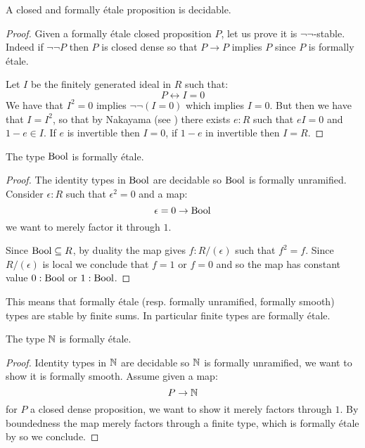 \begin{lemma}\label{closed-and-etale-decidable}
A closed and formally étale proposition is decidable.
\end{lemma} 

\begin{proof}
Given a formally étale closed proposition $P$, let us prove it is $\neg\neg$-stable. Indeed if $\neg\neg P$ then $P$ is closed dense so that $P\to P$ implies $P$ since $P$ is formally étale. 

Let $I$ be the finitely generated ideal in $R$ such that:
\[P\leftrightarrow I=0\]
We have that $I^2=0$ implies $\neg\neg (I=0)$ which implies $I=0$. But then we have that $I=I^2$, so that by Nakayama (see \cite[Lemma II.4.6]{lombardi-quitte}) there exists $e:R$ such that $eI = 0$ and $1-e\in I$. If $e$ is invertible then $I=0$, if $1-e$ in invertible then $I=R$.
\end{proof}

\begin{proposition}\label{bool-is-etale}
  The type $\mathrm{Bool}$ is formally étale.
\end{proposition}

\begin{proof}
The identity types in $\mathrm{Bool}$ are decidable so $\mathrm{Bool}$ is formally unramified. Consider $\epsilon:R$ such that $\epsilon^2=0$ and a map:
\[\epsilon=0 \to \mathrm{Bool}\]
we want to merely factor it through $1$.

 Since $\mathrm{Bool}\subseteq R$, by duality the map gives $f:R/(\epsilon)$ such that $f^2=f$. Since $R/(\epsilon)$ is local we conclude that $f = 1$ or $f=0$ and so the map has constant value $0:\mathrm{Bool}$ or $1:\mathrm{Bool}$.
\end{proof}

\begin{remark}\label{finite-are-etale}
This means that formally étale (resp. formally unramified, formally smooth) types are stable by finite sums. In particular finite types are formally étale.
\end{remark}

\begin{proposition}
The type $\mathbb{N}$ is formally étale.
\end{proposition}

\begin{proof}
Identity types in $\mathbb{N}$ are decidable so $\mathbb{N}$ is formally unramified, we want to show it is formally smooth. Assume given a map:
\[P\to \mathbb{N}\]
for $P$ a closed dense proposition, we want to show it merely factors through $1$. By boundedness the map merely factors through a finite type, which is formally étale by  so we conclude.
\end{proof}

